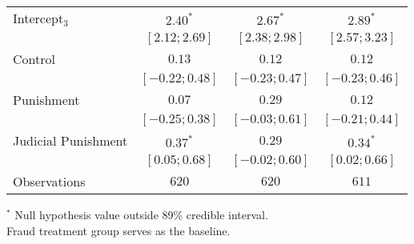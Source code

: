 \begin{table}[h]
\begin{center}
\begin{threeparttable}
\begin{tabular}{l c c c}
Intercept$_3$       & $2.40^{*}$        & $2.67^{*}$        & $2.89^{*}$        \\
                    & $ [ 2.12;  2.69]$ & $ [ 2.38;  2.98]$ & $ [ 2.57;  3.23]$ \\
Control             & $0.13$            & $0.12$            & $0.12$            \\
                    & $ [-0.22;  0.48]$ & $ [-0.23;  0.47]$ & $ [-0.23;  0.46]$ \\
Punishment          & $0.07$            & $0.29$            & $0.12$            \\
                    & $ [-0.25;  0.38]$ & $ [-0.03;  0.61]$ & $ [-0.21;  0.44]$ \\
Judicial Punishment & $0.37^{*}$        & $0.29$            & $0.34^{*}$        \\
                    & $ [ 0.05;  0.68]$ & $ [-0.02;  0.60]$ & $ [ 0.02;  0.66]$ \\
\hline
Observations        & $620$             & $620$             & $611$             \\
\hline
\end{tabular}
\begin{tablenotes}[flushleft]
\scriptsize{$^*$ Null hypothesis value outside 89\% credible interval.  \\
Fraud treatment group serves as the baseline.}
\end{tablenotes}
\end{threeparttable}
\label{table:ol_main_ru_npol_667}
\end{center}
\end{table}
